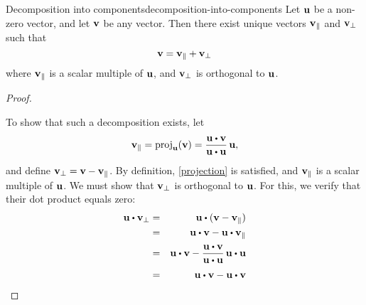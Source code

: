 \begin{theorem}{Decomposition into components}{decomposition-into-components}
  Let $\vect{u}$ be a non-zero vector, and let $\vect{v}$ be any
  vector. Then there exist unique vectors $\vect{v}_{\coll}$ and
  $\vect{v}_{\bot}$ such that
  \begin{equation}\label{projection}
    \vect{v}=\vect{v}_{\coll}+\vect{v}_{\bot}
  \end{equation}
  where $\vect{v}_{\coll}$ is a scalar multiple of $\vect{u}$,
  and $\vect{v}_{\bot}$ is orthogonal to $\vect{u}$.
\end{theorem}

\begin{proof}
  \begin{center}
  \end{center}
  To show that such a decomposition exists, let
  \begin{equation*}
    \vect{v}_{\coll} = \proj_{\vect{u}}(\vect{v}) = \frac{\vect{u}\dotprod \vect{v}}{\vect{u}\dotprod \vect{u}}\, \vect{u},
  \end{equation*}
  and define $\vect{v}_{\bot} = \vect{v}-\vect{v}_{\coll}$. By
  definition, {\eqref{projection}} is satisfied, and
  $\vect{v}_{\coll}$ is a scalar multiple of $\vect{u}$. We must show
  that $\vect{v}_{\bot}$ is orthogonal to $\vect{u}$. For this,
  we verify that their dot product equals zero:
  \begin{eqnarray*}
    \vect{u}\dotprod\vect{v}_{\bot}
    &=& \vect{u}\dotprod(\vect{v}-\vect{v}_{\coll}) \\
    &=& \vect{u}\dotprod\vect{v}-\vect{u}\dotprod\vect{v}_{\coll} \\
    &=& \vect{u}\dotprod \vect{v}-\frac{\vect{u}\dotprod \vect{v}}{\vect{u}\dotprod\vect{u}}\,\vect{u}\dotprod \vect{u} \\
    &=& \vect{u}\dotprod\vect{v}-\vect{u}\dotprod \vect{v} \\

\end{eqnarray*}
\end{proof}
